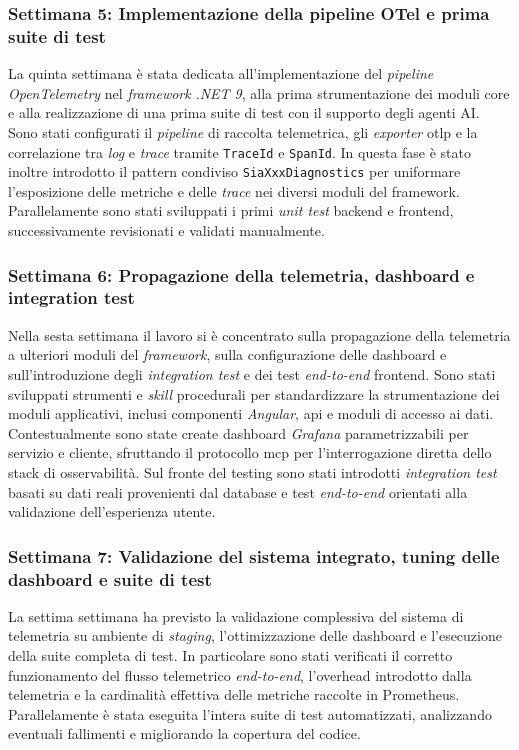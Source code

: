 \subsubsection*{Settimana 5: Implementazione della pipeline OTel e prima suite di test}
La quinta settimana è stata dedicata all'implementazione del \emph{pipeline} \emph{OpenTelemetry} nel \emph{framework} \emph{.NET 9}, alla prima strumentazione dei moduli core e alla realizzazione di una prima suite di test con il supporto degli agenti AI.
Sono stati configurati il \emph{pipeline} di raccolta telemetrica, gli \emph{exporter} \gls{otlp} e la correlazione tra \emph{log} e \emph{trace} tramite \texttt{TraceId} e \texttt{SpanId}.
In questa fase è stato inoltre introdotto il pattern condiviso \texttt{SiaXxxDiagnostics} per uniformare l’esposizione delle metriche e delle \emph{trace} nei diversi moduli del framework.
Parallelamente sono stati sviluppati i primi \emph{unit test} backend e frontend, successivamente revisionati e validati manualmente.

\subsubsection*{Settimana 6: Propagazione della telemetria, dashboard e integration test}
Nella sesta settimana il lavoro si è concentrato sulla propagazione della telemetria a ulteriori moduli del \emph{framework}, sulla configurazione delle dashboard e sull'introduzione degli \emph{integration test} e dei test \emph{end-to-end} frontend.
Sono stati sviluppati strumenti e \emph{skill} procedurali per standardizzare la strumentazione dei moduli applicativi, inclusi componenti \emph{Angular}, \gls{api} e moduli di accesso ai dati.
Contestualmente sono state create dashboard \emph{Grafana} parametrizzabili per servizio e cliente, sfruttando il protocollo \gls{mcp} per l’interrogazione diretta dello stack di osservabilità.
Sul fronte del testing sono stati introdotti \emph{integration test} basati su dati reali provenienti dal database e test \emph{end-to-end} orientati alla validazione dell’esperienza utente.

\subsubsection*{Settimana 7: Validazione del sistema integrato, tuning delle dashboard e suite di test}
La settima settimana ha previsto la validazione complessiva del sistema di telemetria su ambiente di \emph{staging}, l'ottimizzazione delle dashboard e l'esecuzione della suite completa di test.
In particolare sono stati verificati il corretto funzionamento del flusso telemetrico \emph{end-to-end}, l’overhead introdotto dalla telemetria e la cardinalità effettiva delle metriche raccolte in Prometheus.
Parallelamente è stata eseguita l’intera suite di test automatizzati, analizzando eventuali fallimenti e migliorando la copertura del codice.

